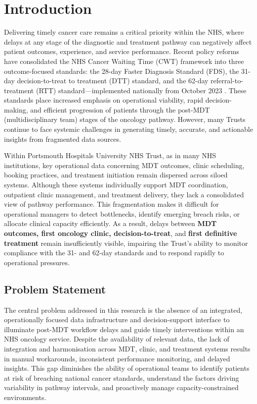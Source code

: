 \chapter{Introduction}
Delivering timely cancer care remains a critical priority within the NHS, where delays at any stage of the diagnostic and treatment pathway can negatively affect patient outcomes, experience, and service performance. Recent policy reforms have consolidated the NHS Cancer Waiting Time (CWT) framework into three outcome-focused standards: the 28-day Faster Diagnosis Standard (FDS), the 31-day decision-to-treat to treatment (DTT) standard, and the 62-day referral-to-treatment (RTT) standard—implemented nationally from October 2023 \citep{johnson2024, NHSDigital2026}. These standards place increased emphasis on operational viability, rapid decision-making, and efficient progression of patients through the post-MDT (multidisciplinary team) stages of the oncology pathway. However, many Trusts continue to face systemic challenges in generating timely, accurate, and actionable insights from fragmented data sources.

Within Portsmouth Hospitals University NHS Trust, as in many NHS institutions, key operational data concerning MDT outcomes, clinic scheduling, booking practices, and treatment initiation remain dispersed across siloed systems. Although these systems individually support MDT coordination, outpatient clinic management, and treatment delivery, they lack a consolidated view of pathway performance. This fragmentation makes it difficult for operational managers to detect bottlenecks, identify emerging breach risks, or allocate clinical capacity efficiently. As a result, delays between \textbf{MDT outcomes, first oncology clinic, decision-to-treat}, and \textbf{first definitive treatment} remain insufficiently visible, impairing the Trust's ability to monitor compliance with the 31- and 62-day standards and to respond rapidly to operational pressures.

\section{Problem Statement}

The central problem addressed in this research is the absence of an integrated, operationally focused data infrastructure and decision-support interface to illuminate post-MDT workflow delays and guide timely interventions within an NHS oncology service. Despite the availability of relevant data, the lack of integration and harmonisation across MDT, clinic, and treatment systems results in manual workarounds, inconsistent performance monitoring, and delayed insights. This gap diminishes the ability of operational teams to identify patients at risk of breaching national cancer standards, understand the factors driving variability in pathway intervals, and proactively manage capacity-constrained environments.

